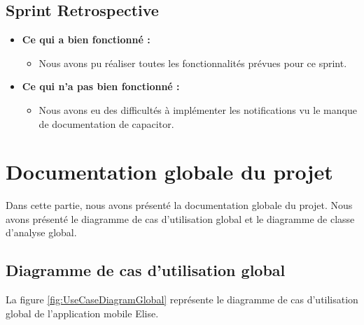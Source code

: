 \subsection{Sprint Retrospective}

\begin{itemize}
  \item \textbf{Ce qui a bien fonctionné :}
  \begin{itemize}
    \item Nous avons pu réaliser toutes les fonctionnalités prévues pour ce sprint.
  \end{itemize}

    \item \textbf{Ce qui n'a pas bien fonctionné :}
    \begin{itemize}
      \item Nous avons eu des difficultés à implémenter les notifications vu le manque de documentation de capacitor.
    \end{itemize}
      
\end{itemize}

\section{Documentation globale du projet}

Dans cette partie, nous avons présenté la documentation globale du projet. Nous avons présenté le diagramme de cas d'utilisation global et le diagramme de classe d'analyse global.

\subsection{Diagramme de cas d'utilisation global}
La figure \ref{fig:UseCaseDiagramGlobal} représente le diagramme de cas d'utilisation global de l'application mobile Elise.

